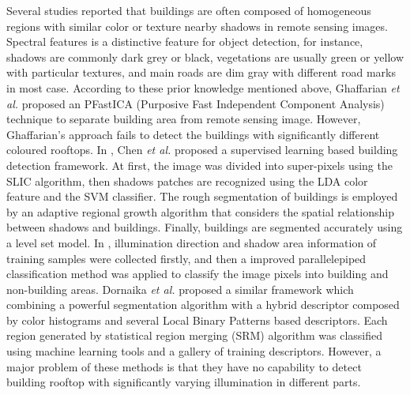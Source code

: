 	Several studies reported that buildings are often composed of homogeneous regions with similar color or texture nearby shadows in remote sensing images. Spectral features is a distinctive feature for object detection, for instance, shadows are commonly dark grey or black, vegetations are usually green or yellow with particular textures, and main roads are dim gray with different road marks in most case. According to these prior knowledge mentioned above, Ghaffarian \textit{et al.}  \cite{ghaffarian2014automaticPFICA} proposed an PFastICA (Purposive Fast Independent Component Analysis) technique to separate building area from remote sensing image. However, Ghaffarian's approach fails to detect the buildings with significantly different coloured rooftops. In \cite{chen2014shadow}, Chen \textit{et al.} proposed a supervised learning based building detection framework. At first, the image was divided into super-pixels using the SLIC \cite{achanta2012slic} algorithm, then shadows patches are recognized using the LDA color feature and the SVM classifier. The rough segmentation of buildings is employed by an adaptive regional growth algorithm that considers the spatial relationship between shadows and buildings. Finally, buildings are segmented accurately using a level set model. In \cite{ghaffarian2014automaticsupervised}, illumination direction and shadow area information of training samples were collected firstly, and then a improved parallelepiped classification method was applied to classify the image pixels into building and non-building areas. Dornaika \textit{et al.} \cite{dornaika2015object} proposed a similar framework which combining a powerful segmentation algorithm with a hybrid descriptor composed by color histograms and several Local Binary Patterns based descriptors. Each region generated by statistical region merging (SRM) algorithm was classified using machine learning tools and a gallery of training descriptors. However, a major problem of these methods is that they have no capability to detect building rooftop with significantly varying illumination in different parts.	
	
